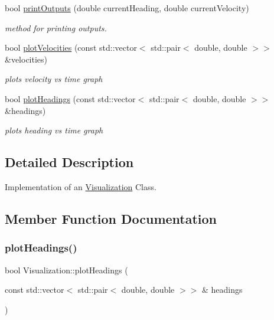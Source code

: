 \begin{DoxyCompactItemize}
bool \hyperlink{classVisualization_a91e89fa4bd219e52963442358cbb5902}{print\+Outputs} (double current\+Heading, double current\+Velocity)
\begin{DoxyCompactList}\small\item\em method for printing outputs. \end{DoxyCompactList}\item 
bool \hyperlink{classVisualization_a4c5e38de378025c6ab9343204faf3fd9}{plot\+Velocities} (const std\+::vector$<$ std\+::pair$<$ double, double $>$$>$ \&velocities)
\begin{DoxyCompactList}\small\item\em plots velocity vs time graph \end{DoxyCompactList}\item 
bool \hyperlink{classVisualization_ae176b32c8d22df0a8f6bf8f5674ecdc6}{plot\+Headings} (const std\+::vector$<$ std\+::pair$<$ double, double $>$$>$ \&headings)
\begin{DoxyCompactList}\small\item\em plots heading vs time graph \end{DoxyCompactList}\end{DoxyCompactItemize}


\subsection{Detailed Description}
Implementation of an \hyperlink{classVisualization}{Visualization} Class. 

\subsection{Member Function Documentation}
\mbox{\label{classVisualization_ae176b32c8d22df0a8f6bf8f5674ecdc6}} 
\subsubsection{\texorpdfstring{plot\+Headings()}{plotHeadings()}}
{\footnotesize\ttfamily bool Visualization\+::plot\+Headings (\begin{DoxyParamCaption}\item[{const std\+::vector$<$ std\+::pair$<$ double, double $>$$>$ \&}]{headings }\end{DoxyParamCaption})}



